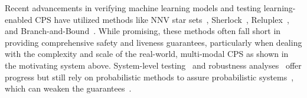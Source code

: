 Recent advancements in verifying machine learning models and testing learning-enabled CPS have utilized methods like NNV star sets~\cite{tran2020verification}, Sherlock~\cite{dutta2019sherlock}, Reluplex~\cite{katz2017reluplex}, and Branch-and-Bound~\cite{bunel2018unified}.
While promising, these methods often fall short in providing comprehensive safety and liveness guarantees, particularly when dealing with the complexity and scale of the real-world, multi-modal CPS as shown in the motivating system above. System-level testing~\cite{deng2022declarative,tian2022mosat,li2020av} and robustness analyses~\cite{tian2018deeptest,deng2020analysis,cai2020real} offer progress but still rely on probabilistic methods to assure probabilistic systems~\cite{cleaveland_monotonic_2022,badithela_evaluation_2023}, which can weaken the guarantees~\cite{badings_probabilities_2023}.




